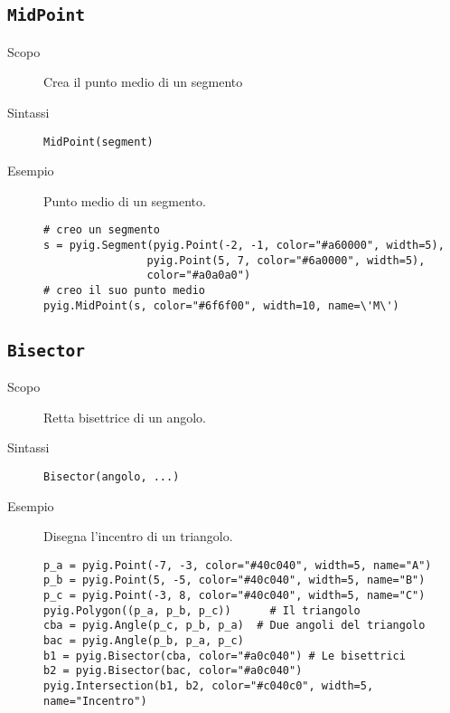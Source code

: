\subsection{\lstinline{MidPoint}}
\label{sub:geoint_midpoint}

\begin{description}
 \item [Scopo] Crea il punto medio di un segmento
 \item [Sintassi] \lstinline{MidPoint(segment)}
% 

 \item [Esempio] Punto medio di un segmento.

\begin{lstlisting}
# creo un segmento
s = pyig.Segment(pyig.Point(-2, -1, color="#a60000", width=5),
                pyig.Point(5, 7, color="#6a0000", width=5), 
                color="#a0a0a0")
# creo il suo punto medio
pyig.MidPoint(s, color="#6f6f00", width=10, name=\'M\')
\end{lstlisting}

\end{description}

\subsection{\lstinline{Bisector}}
\label{sub:geoint_bisector}

\begin{description}
 \item [Scopo] Retta bisettrice di un angolo.
 \item [Sintassi] \lstinline{Bisector(angolo, ...)}

 \item [Esempio] Disegna l'incentro di un triangolo.

\begin{lstlisting}
p_a = pyig.Point(-7, -3, color="#40c040", width=5, name="A")
p_b = pyig.Point(5, -5, color="#40c040", width=5, name="B")
p_c = pyig.Point(-3, 8, color="#40c040", width=5, name="C")
pyig.Polygon((p_a, p_b, p_c))      # Il triangolo
cba = pyig.Angle(p_c, p_b, p_a)  # Due angoli del triangolo
bac = pyig.Angle(p_b, p_a, p_c)
b1 = pyig.Bisector(cba, color="#a0c040") # Le bisettrici
b2 = pyig.Bisector(bac, color="#a0c040")
pyig.Intersection(b1, b2, color="#c040c0", width=5, name="Incentro")
\end{lstlisting}

\end{description}

